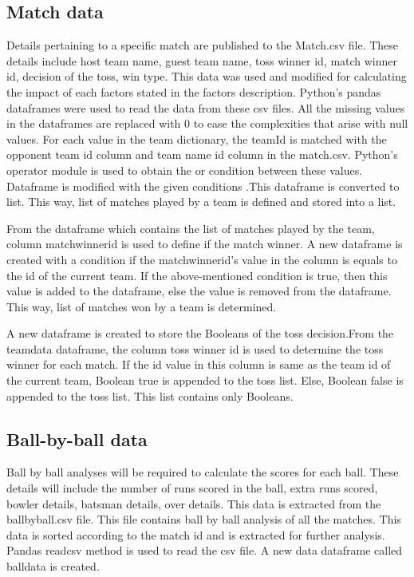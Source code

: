 \documentclass[sigconf]{acmart}
\begin{document}
\subsection{Match data}
 
Details pertaining to a specific match are published to the Match.csv file. These details include host team name, guest team name, toss winner id, match winner id, decision of the toss, win type. This data was used and modified for calculating the impact of each factors stated in the factors description. Python’s pandas dataframes were used to read the data from these csv files. All the missing values in the dataframes are replaced with 0 to ease the complexities that arise with null values. 
For each value in the team dictionary, the teamId is matched with the opponent team id column and team name id column in the match.csv. Python’s operator module is used to obtain the or condition between these values. Dataframe is modified with the given conditions .This dataframe is converted to list. This way, list of matches played by a team is defined and stored into a list.


From the dataframe which contains the list of matches played by the team, column matchwinnerid is used to define if the match winner. A new dataframe is created with a condition if the matchwinnerid’s value in the column is equals to the id of the current team. If the above-mentioned condition is true, then this value is added to the dataframe, else the value is removed from the dataframe. This way, list of matches won by a team is determined.


A new dataframe is created to store the Booleans of the toss decision.From the teamdata dataframe, the column toss winner id is used to determine the toss winner for each match. If the id value in this column is same as the team id of the current team, Boolean true is appended to the toss list. Else, Boolean false is appended to the toss list. This list contains only Booleans. 

\subsection{Ball-by-ball data}
Ball by ball analyses will be required to calculate the scores for each ball. These details will include the number of runs scored in the ball, extra runs scored, bowler details, batsman details, over details. This data is extracted from the ballbyball.csv file. This file contains ball by ball analysis of all the matches. This data is sorted according to the match id and is extracted for further analysis. Pandas readcsv method is used to read the csv file. A new data dataframe called balldata is created.
\end{document}
